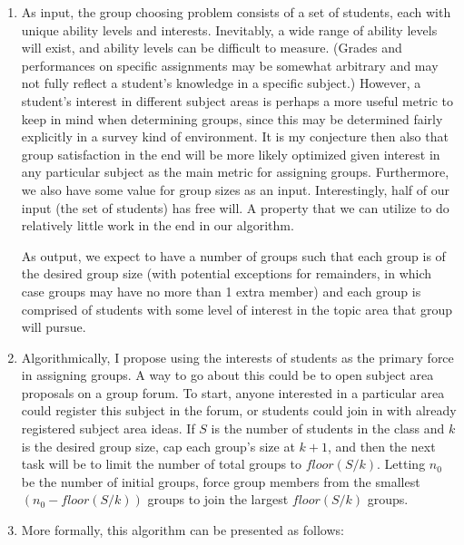 \documentclass{article}
\begin{document}
\begin{enumerate}
	\item As input, the group choosing problem consists of a set of
		students, each with unique ability levels and interests. 
		Inevitably, a wide range of ability levels will exist, and
		ability levels can be difficult to measure. (Grades and performances
		on specific assignments may be somewhat arbitrary and may not
		fully reflect a student's knowledge in a specific subject.) 
		However, a student's interest in different subject areas is 
		perhaps a more useful metric to keep in mind when determining 
		groups, since this may be determined fairly explicitly in a 
		survey kind of environment. It is my conjecture then also that group
		satisfaction in the end will be more likely optimized given interest
		in any particular subject as the main metric for assigning groups.
		Furthermore, we also have some value for group sizes as an input.
		Interestingly, half of our input (the set of students) has free
		will. A property that we can utilize to do relatively little work
		in the end in our algorithm.

		As output, we expect to have a number of groups such that each
		group is of the desired group size (with potential exceptions for
		remainders, in which case groups may have no more than 1 extra member)
		and each group is comprised of students with some level of interest
		in the topic area that group will pursue.

	\item Algorithmically, I propose using the interests of students as the primary
		force in assigning groups. A way to go about this 
		could be to open subject area proposals on a group forum.
		To start, anyone interested in a particular area could register
		this subject in the forum, or students could join in with already
		registered subject area ideas. If $S$ is the number of students in the 
		class and $k$ is the desired group size, cap each group's size at $k+1$,
		and then the next task will be to
		limit the number of total groups to $floor(S/k)$. Letting $n_0$ be the number
		of initial groups, force group members from the smallest $(n_0 - floor(S/k))$
		groups to join the largest $floor(S/k)$ groups.
	\item More formally, this algorithm can be presented as follows:


\end{enumerate}
\end{document}
